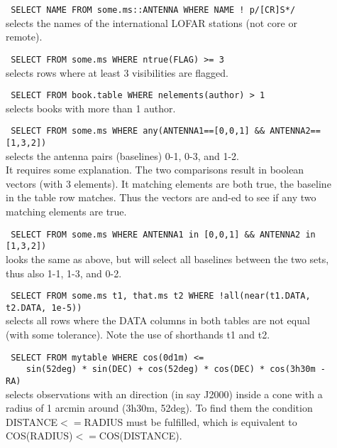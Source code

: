 \begin{description}
  \item[] \texttt{ SELECT NAME FROM some.ms::ANTENNA WHERE NAME !~p/[CR]S*/}
     \\selects the names of the international LOFAR stations (not core
     or remote).

  \item[] \texttt{ SELECT FROM some.ms WHERE ntrue(FLAG) >= 3}
     \\selects rows where at least 3 visibilities are flagged.

  \item[] \texttt{ SELECT FROM book.table WHERE nelements(author) > 1}
     \\selects books with more than 1 author.

  \item[] \texttt{ SELECT FROM some.ms WHERE
         any(ANTENNA1==[0,0,1] \&\& ANTENNA2==[1,3,2])}
     \\selects the antenna pairs (baselines) 0-1, 0-3, and 1-2.
     \\It requires some explanation. The two comparisons result in
     boolean vectors (with 3 elements). It matching elements are both
     true, the baseline in the table row matches. Thus the vectors are
     and-ed to see if any two matching elements are true.

  \item[] \texttt{ SELECT FROM some.ms WHERE
         ANTENNA1 in [0,0,1] \&\& ANTENNA2 in [1,3,2])}
     \\looks the same as above, but will select all baselines
     between the two sets, thus also 1-1, 1-3, and 0-2.

  \item[] \texttt{ SELECT FROM some.ms t1, that.ms t2
      WHERE !all(near(t1.DATA, t2.DATA, 1e-5))}
     \\ selects all rows where the DATA columns in both tables are
     not equal (with some tolerance). Note the use of shorthands t1 and t2.

  \item[] \texttt{ SELECT FROM mytable WHERE cos(0d1m) <=}
     \\\verb=    =
     \texttt{sin(52deg) * sin(DEC) + cos(52deg) * cos(DEC) * cos(3h30m - RA) }
     \\selects observations with an direction (in say J2000)
     inside a cone with a radius of 1 arcmin around (3h30m, 52deg).
     To find them the condition DISTANCE$<=$RADIUS must be fulfilled,
     which is equivalent to COS(RADIUS)$<=$COS(DISTANCE).


\end{description}
